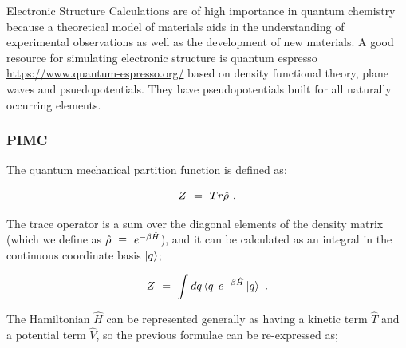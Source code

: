 \documentclass{article}
\begin{document}
Electronic Structure Calculations are of high importance in quantum chemistry because a theoretical model of materials aids in the understanding of experimental observations as well as the development of new materials. A good resource for simulating electronic structure is quantum espresso \url{https://www.quantum-espresso.org/} based on density functional theory, plane waves and psuedopotentials. They have pseudopotentials built for all naturally occurring elements. 











\subsubsection{PIMC}

The quantum mechanical partition function is defined as;

\begin{equation} \label{eq:1}
Z \hspace{0.125cm} = \hspace{0.125cm} Tr\hat{\rho} \hspace{0.125cm} .
\end{equation}

The trace operator is a sum over the diagonal elements of the density matrix (which we define as \begin{math} \hat{\rho} \hspace{0.125cm} \equiv \hspace{0.125cm} e^{-\beta \hat{H}} \end{math}), and it can be calculated as an integral in the continuous coordinate basis \begin{math} \ket{q} \end{math};

\begin{equation} \label{eq:1}
Z \hspace{0.125cm} = \hspace{0.125cm} \int dq \bra{q} e^{-\beta \hat{H}} \ket{q} \hspace{0.125cm} .
\end{equation}

The Hamiltonian \begin{math} \hat{H} \end{math} can be represented generally as having a kinetic term \begin{math} \hat{T} \end{math} and a potential term \begin{math} \hat{V} \end{math}, so the previous formulae can be re-expressed as;
\end{document}
